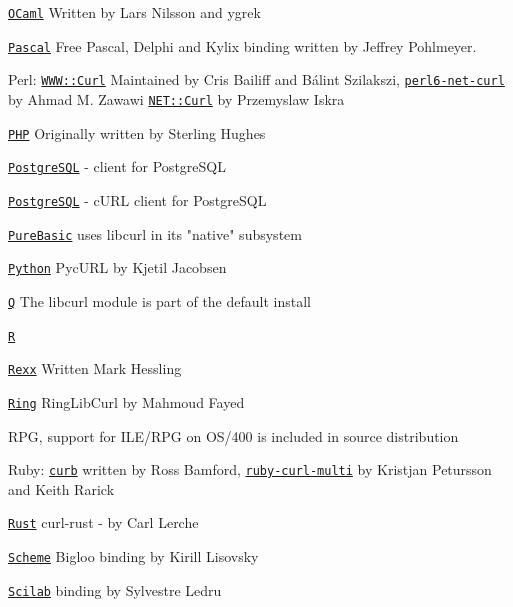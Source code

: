 \href{https://opam.ocaml.org/packages/ocurl/}{\texttt{OCaml}} Written by Lars Nilsson and ygrek

\href{https://web.archive.org/web/20030804091414/houston.quik.com/jkp/curlpas/}{\texttt{Pascal}} Free Pascal, Delphi and Kylix binding written by Jeffrey Pohlmeyer.

Perl\+: \href{https://github.com/szbalint/WWW--Curl}{\texttt{WWW\+::\+Curl}} Maintained by Cris Bailiff and Bálint Szilakszi, \href{https://github.com/azawawi/perl6-net-curl}{\texttt{perl6-\/net-\/curl}} by Ahmad M. Zawawi \href{https://metacpan.org/pod/Net::Curl}{\texttt{NET\+::\+Curl}} by Przemyslaw Iskra

\href{https://php.net/curl}{\texttt{PHP}} Originally written by Sterling Hughes

\href{https://github.com/pramsey/pgsql-http}{\texttt{Postgre\+SQL}} -\/  client for Postgre\+SQL

\href{https://github.com/RekGRpth/pg_curl}{\texttt{Postgre\+SQL}} -\/ c\+URL client for Postgre\+SQL

\href{https://www.purebasic.com/documentation/http/index.html}{\texttt{Pure\+Basic}} uses libcurl in its "{}native"{}  subsystem

\href{http://pycurl.io/}{\texttt{Python}} Pyc\+URL by Kjetil Jacobsen

\href{https://q-lang.sourceforge.net/}{\texttt{Q}} The libcurl module is part of the default install

\href{https://cran.r-project.org/package=curl}{\texttt{R}}

\href{https://rexxcurl.sourceforge.net/}{\texttt{Rexx}} Written Mark Hessling

\href{https://ring-lang.sourceforge.io/doc1.3/libcurl.html}{\texttt{Ring}} Ring\+Lib\+Curl by Mahmoud Fayed

RPG, support for ILE/\+RPG on OS/400 is included in source distribution

Ruby\+: \href{https://github.com/taf2/curb}{\texttt{curb}} written by Ross Bamford, \href{https://github.com/kball/curl_multi.rb}{\texttt{ruby-\/curl-\/multi}} by Kristjan Petursson and Keith Rarick

\href{https://github.com/alexcrichton/curl-rust}{\texttt{Rust}} curl-\/rust -\/ by Carl Lerche

\href{http://www.metapaper.net/lisovsky/web/curl/}{\texttt{Scheme}} Bigloo binding by Kirill Lisovsky

\href{https://help.scilab.org/docs/current/fr_FR/getURL.html}{\texttt{Scilab}} binding by Sylvestre Ledru


